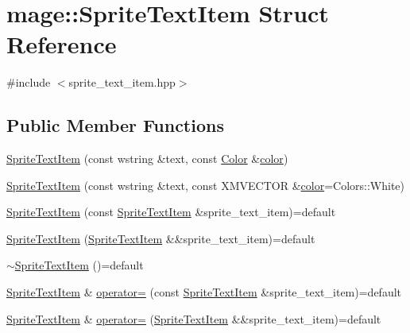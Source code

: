 \hypertarget{structmage_1_1_sprite_text_item}{}\section{mage\+:\+:Sprite\+Text\+Item Struct Reference}
\label{structmage_1_1_sprite_text_item}


{\ttfamily \#include $<$sprite\+\_\+text\+\_\+item.\+hpp$>$}

\subsection*{Public Member Functions}
\begin{DoxyCompactItemize}
\item 
\hyperlink{structmage_1_1_sprite_text_item_a887e1db9520a6d08e77c554a863dfd47}{Sprite\+Text\+Item} (const wstring \&text, const \hyperlink{structmage_1_1_color}{Color} \&\hyperlink{namespacemage_a56eceea5a9bceb2b56073f3ea4945781}{color})
\item 
\hyperlink{structmage_1_1_sprite_text_item_a127d499a50f0dd11b3e3b6598f4b2088}{Sprite\+Text\+Item} (const wstring \&text, const X\+M\+V\+E\+C\+T\+OR \&\hyperlink{namespacemage_a56eceea5a9bceb2b56073f3ea4945781}{color}=Colors\+::\+White)
\item 
\hyperlink{structmage_1_1_sprite_text_item_ae5cbffcab97065bb719aafda3dd4ab5d}{Sprite\+Text\+Item} (const \hyperlink{structmage_1_1_sprite_text_item}{Sprite\+Text\+Item} \&sprite\+\_\+text\+\_\+item)=default
\item 
\hyperlink{structmage_1_1_sprite_text_item_a63f6da078daaf11e0412ab242eb233ee}{Sprite\+Text\+Item} (\hyperlink{structmage_1_1_sprite_text_item}{Sprite\+Text\+Item} \&\&sprite\+\_\+text\+\_\+item)=default
\item 
\hyperlink{structmage_1_1_sprite_text_item_a7e130ad6ffd67a6bae97cae676c6bbb0}{$\sim$\+Sprite\+Text\+Item} ()=default
\item 
\hyperlink{structmage_1_1_sprite_text_item}{Sprite\+Text\+Item} \& \hyperlink{structmage_1_1_sprite_text_item_ac0c8772b01eaa324e46dc53d08a9ea35}{operator=} (const \hyperlink{structmage_1_1_sprite_text_item}{Sprite\+Text\+Item} \&sprite\+\_\+text\+\_\+item)=default
\item 
\hyperlink{structmage_1_1_sprite_text_item}{Sprite\+Text\+Item} \& \hyperlink{structmage_1_1_sprite_text_item_aadbeeb0fb30b15675370f0b6eb65a9a2}{operator=} (\hyperlink{structmage_1_1_sprite_text_item}{Sprite\+Text\+Item} \&\&sprite\+\_\+text\+\_\+item)=default

\end{DoxyCompactItemize}
